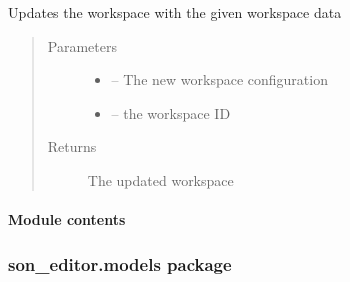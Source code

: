 \documentclass[letterpaper,10pt,english]{sphinxmanual}
\begin{document}

\begin{fulllineitems}
\label{_source/son_editor.impl:son_editor.impl.workspaceimpl.test_url}
\end{fulllineitems}


\begin{fulllineitems}
\label{_source/son_editor.impl:son_editor.impl.workspaceimpl.update_workspace}
Updates the workspace with the given workspace data
\begin{quote}\begin{description}
\item[{Parameters}] \leavevmode\begin{itemize}
\item {} 
 -- The new workspace configuration

\item {} 
 -- the workspace ID

\end{itemize}

\item[{Returns}] \leavevmode
The updated workspace

\end{description}\end{quote}

\end{fulllineitems}



\paragraph{Module contents}
\label{_source/son_editor.impl:module-son_editor.impl}\label{_source/son_editor.impl:module-contents}

\subsubsection{son\_editor.models package}
\label{_source/son_editor.models::doc}\label{_source/son_editor.models:son-editor-models-package}
\end{document}
